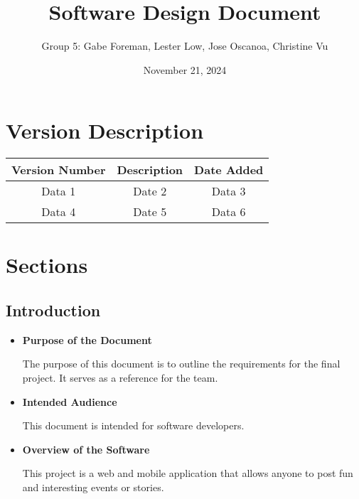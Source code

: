 \documentclass{article}
\title{Software Design Document}
\author{Group 5: Gabe Foreman, Lester Low, Jose Oscanoa, Christine Vu}
\date{November 21, 2024}
\begin{document}
\maketitle
\tableofcontents
\newpage

\section{Version Description}
\begin{table}[h!]
    \centering
    \begin{tabular}{c|c|c}
    \hline
    Version Number & Description & Date Added \\ \hline
    Data 1 & Date 2 & Data 3 \\ \hline
    Data 4 & Date 5 & Data 6 \\ \hline
    \end{tabular}
    \label{tab:my_label}
\end{table}

\section{Sections}
\subsection{Introduction}
\begin{itemize}
    \item \textbf{Purpose of the Document}         
            
            The purpose of this document is to outline the requirements for the final project. It serves as a reference for the team.
            
    \item \textbf{Intended Audience} 
            
            This document is intended for software developers.
            
    \item \textbf{Overview of the Software}
            
            This project is a web and mobile application that allows anyone to post fun and interesting events or stories.

\end{itemize}
\end{document}
